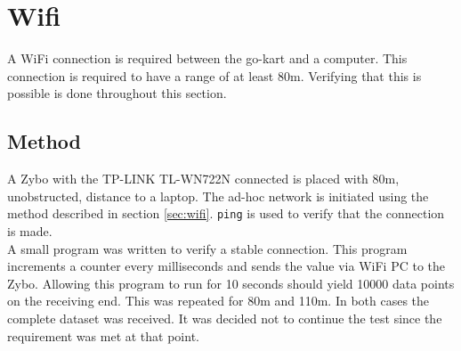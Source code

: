 \section{Wifi}
\label{sec:wifiverification}
A WiFi connection is required between the go-kart and a computer.
This connection is required to have a range of at least 80\si{\metre}.
Verifying that this is possible is done throughout this section.

\subsection{Method}
A Zybo with the TP-LINK TL-WN722N connected is placed with 80\si{\metre}, unobstructed, distance to a laptop.
The ad-hoc network is initiated using the method described in section \ref{sec:wifi}.
\texttt{ping} is used to verify that the connection is made.\\
A small program was written to verify a stable connection.
This program increments a counter every milliseconds and sends the value via WiFi PC to the Zybo.
Allowing this program to run for 10 seconds should yield 10000 data points on the receiving end.
This was repeated for 80\si{\metre} and 110\si{\metre}.
In both cases the complete dataset was received.
It was decided not to continue the test since the requirement was met at that point.
